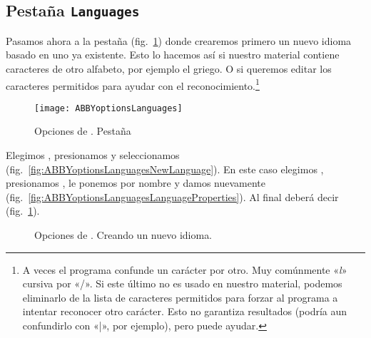 \documentclass[%
	a5paper,
	10pt,
	twoside,
	openright,
	final,
]{memoir}
\begin{document}
	\subsection{Pestaña \texttt{Languages}} Pasamos ahora a la pestaña  (fig.~\ref{fig:ABBYoptionsLanguages}) donde crearemos primero un nuevo idioma basado en uno ya existente. Esto lo hacemos así si nuestro material contiene caracteres de otro alfabeto, por ejemplo el griego. O si queremos editar los caracteres permitidos para ayudar con el reconocimiento.\footnote{A veces el programa confunde un carácter por otro. Muy comúnmente «\textit{l}» cursiva por «/». Si este último no es usado en nuestro material, podemos eliminarlo de la lista de caracteres permitidos para forzar al programa a intentar reconocer otro carácter. Esto no garantiza resultados (podría aun confundirlo con «|», por ejemplo), pero puede ayudar.}

	\begin{figure}
		\centering
		\texttt{[image: ABBYoptionsLanguages]}
		\caption[Opciones de \abby. Pestaña Languages]{Opciones de \abby. Pestaña \label{fig:ABBYoptionsLanguages}}
	\end{figure}

	Elegimos , presionamos  y seleccionamos  (fig.~\ref{fig:ABBYoptionsLanguagesNewLanguage}). En este caso elegimos , presionamos , le ponemos por nombre  y damos  nuevamente (fig.~\ref{fig:ABBYoptionsLanguagesLanguageProperties}). Al final deberá decir  (fig.~\ref{fig:ABBYoptionsLanguages}).

	\begin{figure}
		\centering
		\caption{Opciones de \abby. Creando un nuevo idioma.}
	\end{figure}
\end{document}
